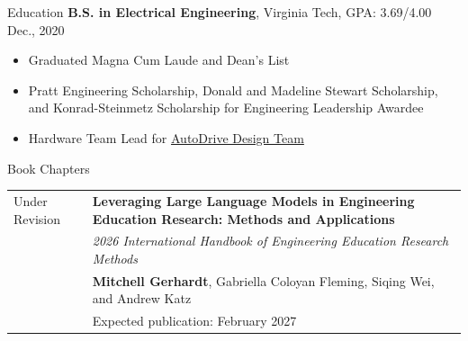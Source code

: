 \documentclass{resume}
\begin{document}
\begin{rSection}{Education}
{\textbf {B.S. in Electrical Engineering}}, Virginia Tech, GPA: 3.69/4.00 \hfill {Dec., 2020}
\begin{itemize}
    \item[] \vspace{-0.5em} \hspace{-1.0em} Graduated Magna Cum Laude and Dean's List 
    \item[] \vspace{-0.5em} \hspace{-1.0em} Pratt Engineering Scholarship, Donald and Madeline Stewart Scholarship, and Konrad-Steinmetz Scholarship for Engineering Leadership Awardee
    \item[] \vspace{-0.5em} \hspace{-1.0em} Hardware Team Lead for \href{https://eng.vt.edu/academics/student-teams/autodrive.html}{AutoDrive Design Team}
\end{itemize}
\end{rSection}



\begin{rSection}{Book Chapters}
\begin{tabularx}{\textwidth}{p{2.5cm}X}
Under \newline Revision & \textbf{Leveraging Large Language Models in Engineering Education Research: Methods and Applications}\\
& \emph{2026 International Handbook of Engineering Education Research
Methods}\\
& \textbf{Mitchell Gerhardt}, Gabriella Coloyan Fleming, Siqing Wei, and Andrew Katz\\
& Expected publication: February 2027\\
\end{tabularx}
\end{rSection}

\end{document}

